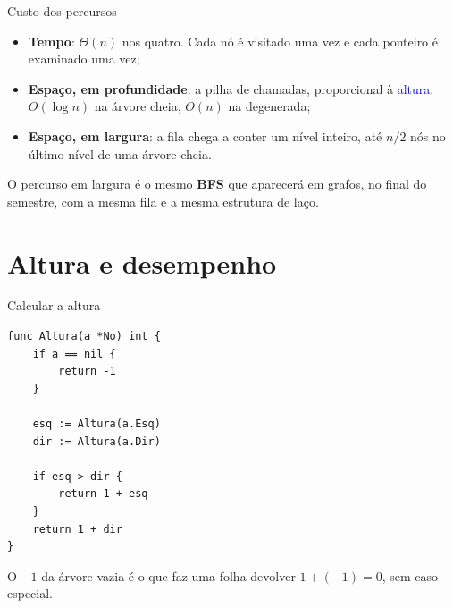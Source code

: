 \documentclass{beamer}
\newcommand{\tcb}[1]{\textcolor{blue}{#1}}
\begin{document}
\begin{frame}{Custo dos percursos}
  \begin{itemize}
    \item \textbf{Tempo}: $\Theta(n)$ nos quatro. Cada nó é visitado uma vez e
          cada ponteiro é examinado uma vez;
    \item \textbf{Espaço, em profundidade}: a pilha de chamadas, proporcional à
          \tcb{altura}. $O(\log n)$ na árvore cheia, $O(n)$ na degenerada;
    \item \textbf{Espaço, em largura}: a fila chega a conter um nível inteiro,
          até $n/2$ nós no último nível de uma árvore cheia.
  \end{itemize}

  \vspace{0.5cm}
  O percurso em largura é o mesmo \textbf{BFS} que aparecerá em grafos, no final
  do semestre, com a mesma fila e a mesma estrutura de laço.
\end{frame}

\section{Altura e desempenho}

\begin{frame}[fragile]{Calcular a altura}
  \begin{verbatim}
func Altura(a *No) int {
    if a == nil {
        return -1
    }

    esq := Altura(a.Esq)
    dir := Altura(a.Dir)

    if esq > dir {
        return 1 + esq
    }
    return 1 + dir
}
  \end{verbatim}

  \vspace{0.2cm}
  O $-1$ da árvore vazia é o que faz uma folha devolver $1 + (-1) = 0$, sem caso
  especial.
\end{frame}
\end{document}
